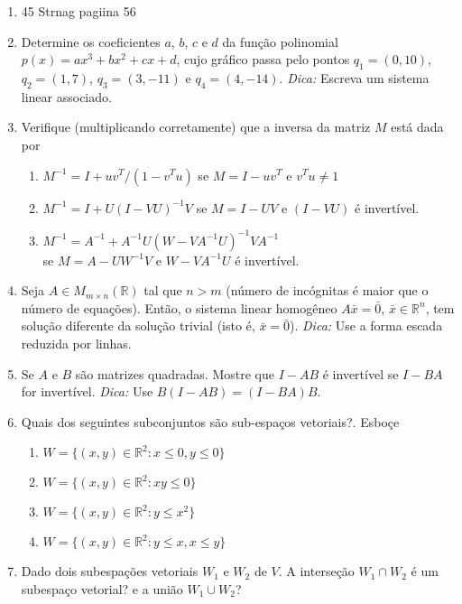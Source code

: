 \documentclass{article}
\theoremstyle{plain}
\theoremstyle{obs}
\numberwithin{equation}{section}
\begin{document}
\begin{enumerate}
   \item 45 Strnag pagiina 56
   
   \item Determine os coeficientes $a$, $b$, $c$ e $d$ da função polinomial 
   $p(x)=a x^3 + bx^2 + cx + d$, cujo gráfico passa pelo pontos
   $q_{1}=(0,10)$, $q_2=(1,7)$, $q_3=(3,-11)$ e $q_4=(4,-14)$. 
   {\it Dica:} Escreva um sistema linear associado.
   \item 
   Verifique (multiplicando corretamente) que a inversa da matriz $M$
   está dada por
     \begin{enumerate}
      \item $M^{-1}= I+ uv^{T}/(1-v^{T}u)$ se $M=I-uv^{T}$ e $v^{T}u \neq 1$
      \item $M^{-1}= I+U(I-VU)^{-1}V$ se $M=I-UV$ e $(I-VU)$ é invertível.
      \item $M^{-1}= A^{-1}+A^{-1}U(W-VA^{-1}U)^{-1}VA^{-1}$ \\
            se $M=A-UW^{-1}V$ e $W-VA^{-1}U$ é invertível.
     \end{enumerate}
   
   \item Seja $A \in M_{m\times n}(\mathbb{R})$ tal que $n>m$ 
   (número de incógnitas é maior que o número de equações).
   Então, o sistema linear homogêneo $A\bar{x}=\bar{0}$, 
   $\bar{x}\in \mathbb{R}^{n}$, tem solução diferente da solução trivial 
   (isto é, $\bar{x}=\bar{0}$). \newline
   {\it Dica: } Use a forma escada reduzida por linhas.
   
   \item Se $A$ e $B$ são matrizes quadradas. Mostre que $I-AB$ é invertível se $I-BA$ 
   for invertível. {\it Dica:} Use $B(I-AB)=(I-BA)B$.
   
   \item Quais dos seguintes subconjuntos são sub-espaços vetoriais?. Esboçe
     \begin{enumerate}
     \item $W=\{(x,y) \in \mathbb{R}^{2}: x\leq 0, y\leq0\}$
     \item $W=\{(x,y) \in \mathbb{R}^{2}: xy\leq0\}$
     \item $W=\{(x,y) \in \mathbb{R}^{2}: y\leq x^{2} \}$
     \item $W=\{(x,y) \in \mathbb{R}^{2}: y\leq x, x \leq y \}$
     \end{enumerate}
     
   \item Dado dois subespações vetoriais $W_1$ e $W_2$ de $V$. A interseção 
   $W_{1}\cap W_2$ é um subespaço vetorial? e a união  $W_{1}\cup W_2$?
    

\end{enumerate}
\end{document}
